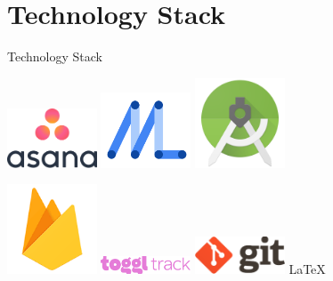 \documentclass[12pt]{beamer}
\begin{document}
\section{Technology Stack}
\begin{frame}{Technology Stack}

\begin{center}

\includegraphics[width=0.2\textwidth]{asana}
\includegraphics[width=0.2\textwidth]{mlkit}
\includegraphics[width=0.2\textwidth]{androidstudio}

\includegraphics[width=0.2\textwidth]{firebase}
\includegraphics[width=0.2\textwidth]{toggl}
\includegraphics[width=0.2\textwidth]{git}
{\LARGE \LaTeX}
\end{center}
\end{frame}
\end{document}
